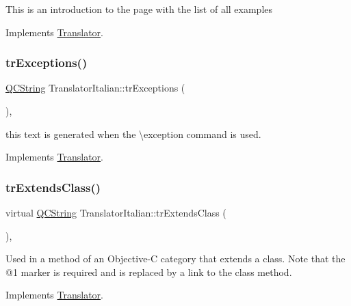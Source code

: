 This is an introduction to the page with the list of all examples 

Implements \mbox{\hyperlink{class_translator}{Translator}}.

\mbox{\label{class_translator_italian_a031a42a99a64a7c806bd6ce0c26e65e6}} 
\subsubsection{\texorpdfstring{trExceptions()}{trExceptions()}}
{\footnotesize\ttfamily \mbox{\hyperlink{class_q_c_string}{Q\+C\+String}} Translator\+Italian\+::tr\+Exceptions (\begin{DoxyParamCaption}{ }\end{DoxyParamCaption})\hspace{0.3cm}{\ttfamily [inline]}, {\ttfamily [virtual]}}

this text is generated when the \textbackslash{}exception command is used. 

Implements \mbox{\hyperlink{class_translator}{Translator}}.

\mbox{\label{class_translator_italian_a7ff4a745cd1b2178954a0811d3a8600f}} 
\subsubsection{\texorpdfstring{trExtendsClass()}{trExtendsClass()}}
{\footnotesize\ttfamily virtual \mbox{\hyperlink{class_q_c_string}{Q\+C\+String}} Translator\+Italian\+::tr\+Extends\+Class (\begin{DoxyParamCaption}{ }\end{DoxyParamCaption})\hspace{0.3cm}{\ttfamily [inline]}, {\ttfamily [virtual]}}

Used in a method of an Objective-\/C category that extends a class. Note that the @1 marker is required and is replaced by a link to the class method. 

Implements \mbox{\hyperlink{class_translator}{Translator}}.

\mbox{\label{class_translator_italian_a9229cf743df7121024614b8b60603427}} 
